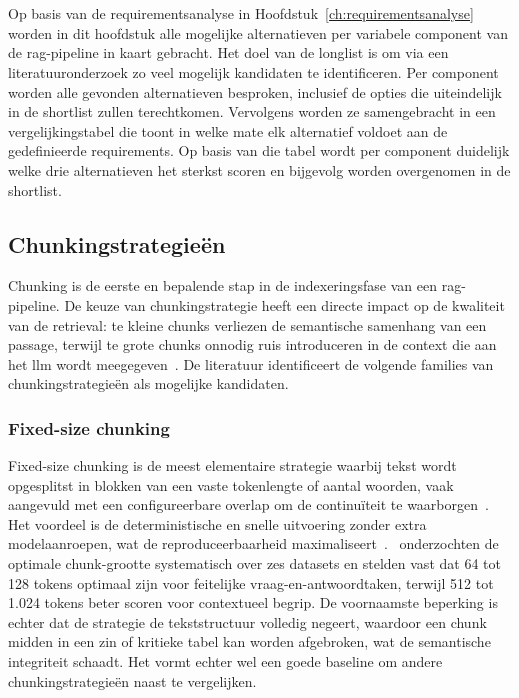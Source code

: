 \chapter{}%
\label{ch:longlist}

Op basis van de requirementsanalyse in Hoofdstuk~\ref{ch:requirementsanalyse} worden in dit hoofdstuk alle mogelijke alternatieven per variabele component van de \gls{rag}-pipeline in kaart gebracht. Het doel van de longlist is om via een literatuuronderzoek zo veel mogelijk kandidaten te identificeren. Per component worden alle gevonden alternatieven besproken, inclusief de opties die uiteindelijk in de shortlist zullen terechtkomen. Vervolgens worden ze samengebracht in een vergelijkingstabel die toont in welke mate elk alternatief voldoet aan de gedefinieerde requirements. Op basis van die tabel wordt per component duidelijk welke drie alternatieven het sterkst scoren en bijgevolg worden overgenomen in de shortlist.

\section{Chunkingstrategieën}
\label{sec:longlist-chunking}

Chunking is de eerste en bepalende stap in de indexeringsfase van een \gls{rag}-pipeline. De keuze van chunkingstrategie heeft een directe impact op de kwaliteit van de retrieval: te kleine chunks verliezen de semantische samenhang van een passage, terwijl te grote chunks onnodig ruis introduceren in de context die aan het \gls{llm} wordt meegegeven~\autocite{Moro2025}. De literatuur identificeert de volgende families van chunkingstrategieën als mogelijke kandidaten.

\subsection{Fixed-size chunking}

Fixed-size chunking is de meest elementaire strategie waarbij tekst wordt opgesplitst in blokken van een vaste tokenlengte of aantal woorden, vaak aangevuld met een configureerbare overlap om de continuïteit te waarborgen~\autocite{Glukhov2026}. Het voordeel is de deterministische en snelle uitvoering zonder extra modelaanroepen, wat de reproduceerbaarheid maximaliseert~\autocite{QuEtAl2024}.~\textcite{BhatEtAl2025} onderzochten de optimale chunk-grootte systematisch over zes datasets en stelden vast dat 64 tot 128 tokens optimaal zijn voor feitelijke vraag-en-antwoordtaken, terwijl 512 tot 1.024 tokens beter scoren voor contextueel begrip. De voornaamste beperking is echter dat de strategie de tekststructuur volledig negeert, waardoor een chunk midden in een zin of kritieke tabel kan worden afgebroken, wat de semantische integriteit schaadt. Het vormt echter wel een goede baseline om andere chunkingstrategieën naast te vergelijken.


